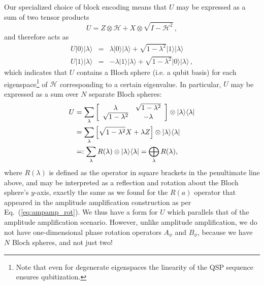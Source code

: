 \documentclass[aps,pra,showpacs,notitlepage,twocolumn,superscriptaddress,nofootinbib]{revtex4-1}
\def\>{\rangle}
\def\<{\langle}
\newcommand{\bea}{\begin{eqnarray}}
\newcommand{\eea}{\end{eqnarray}}
\newcommand{\be}{\begin{equation}}
\newcommand{\ee}{\end{equation}}
\newcommand{\mattwocb}[4]{\left[
	\begin{array}{cc}{#1}&{#2}\\{#3}&{#4}\end{array}\right]}
\def\lbL{\lb\rule{0pt}{2.4ex}}
\def\lb{\left[}			\def\rb{\right]}
\begin{document}
Our specialized choice of block encoding means that $U$ may be expressed as a sum of two tensor products
    \be
    	U = Z\otimes \mathcal{H} + X \otimes \sqrt{I-\mathcal{H}^2}
    \,,
    \ee
and therefore acts as
    \bea
        U |0\>|\lambda\> &=& \lambda |0\>|\lambda\> + \sqrt{1-\lambda^2} |1\>|\lambda\> \\
        U |1\>|\lambda\> &=& -\lambda |1\>|\lambda\> + \sqrt{1-\lambda^2} |0\>|\lambda\>
        \,,
    \eea
which indicates that $U$ contains a Bloch sphere (i.e. a qubit basis) for each eigenspace\footnote{Note that even for degenerate eigenspaces the linearity of the QSP sequence ensures qubitization.} of $\mathcal{H}$ corresponding to a certain eigenvalue. In particular, $U$ may be expressed as a sum over $N$ separate Bloch spheres:
    \begin{align}\label{eq:uham_bloch_spheres}
        \begin{aligned}
            U &= \sum_\lambda \mattwocb{\lambda}{\sqrt{1-\lambda^2}}{\sqrt{1-\lambda^2}}{-\lambda} \otimes |\lambda\>\<\lambda| 
            \\
            &= \sum_\lambda \lbL{ \sqrt{1-\lambda^2} X + \lambda Z }\rb  \otimes |\lambda\>\<\lambda| 
            \\
            &=: \sum_\lambda R(\lambda)  \otimes |\lambda\>\<\lambda| = \bigoplus_\lambda R(\lambda) ,
        \end{aligned}
    \end{align}
where $R(\lambda)$ is defined as the operator in square
brackets in the penultimate line above, and may be interpreted as a reflection and rotation about the Bloch sphere's $y$-axis, exactly the same as we found for the $R(a)$ operator that appeared in the amplitude amplification construction as per Eq.~(\ref{eq:ampamp_rot}). We thus have a form for $U$ which parallels that of the amplitude amplification scenario. However, unlike amplitude amplification, we do not have one-dimensional phase rotation operators $A_\phi$ and $B_\phi$, because we have $N$ Bloch spheres, and not just two!
\end{document}
